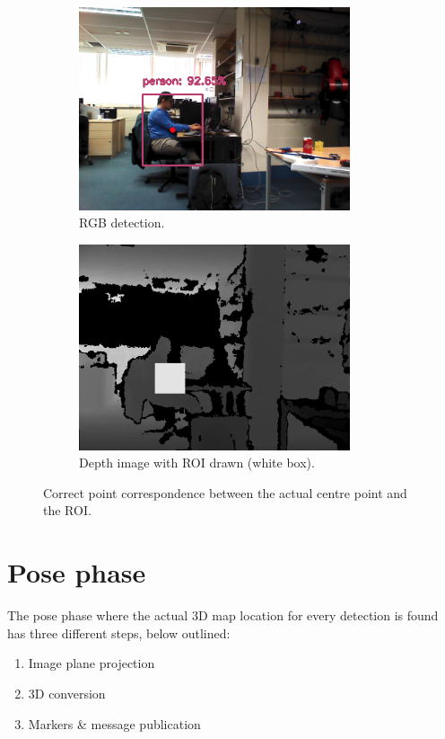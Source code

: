 \begin{figure}[H]
	\centering
    \begin{subfigure}{.5\textwidth}
      \centering
      \includegraphics[width=8cm]{images/chapter4_rgb_ratio.png}
      \caption{RGB detection.}
      \label{fig:ratin}
    \end{subfigure}%
    
    \begin{subfigure}{.5\textwidth}
      \centering
      \includegraphics[width=8cm]{images/chapter4_rgbd_ratio.png}
      \caption{Depth image with ROI drawn (white box).}
      \label{fig:ration}
    \end{subfigure}%
    
    \caption{Correct point correspondence between the actual centre point and the ROI.}
\end{figure}

\section{Pose phase}

The pose phase where the actual 3D map location for every detection is found has three different steps, below outlined:

\begin{enumerate}
  \item Image plane projection
  \item 3D conversion
  \item Markers \& message publication
\end{enumerate}

